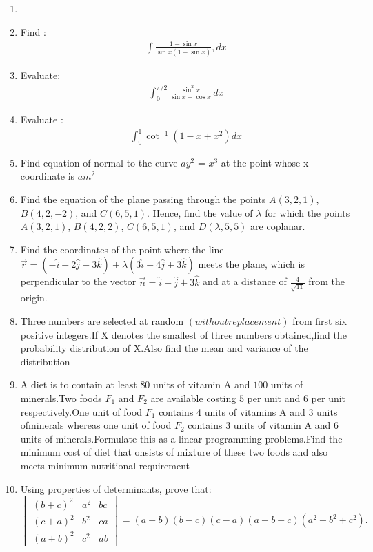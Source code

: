 \documentclass[12pt,-letter paper]{article}
\providecommand{\mydet}[1]{\ensuremath{\begin{vmatrix}#1\end{vmatrix}}}
\providecommand{\brak}[1]{\ensuremath{\left(#1\right)}}
\begin{document}
\begin{enumerate}
\item
	\item Find : \begin{align*}\int\frac{1-\sin{x}}{\sin{x}(1+\sin{x})},dx\end{align*}
\item
	 Evaluate: \begin{align*}\int_{0}^{\pi/2} \frac{\sin^2 x}{\sin{x} + \cos{x}} \, d    x\end{align*}
\item
	 Evaluate : \begin{align*}\int_{0}^{1}\cot^{-1}(1-x+x^2)dx\end{align*}
\item
	Find equation of normal to the curve $a$$y^{2}$ = $x^{3}$ at the point whose x coordinate is $am^{2}$
\item
	Find the equation of the plane passing through the points $A\brak{3, 2,1} $, $ B \brak{4, 2, -2} $, and $ C \brak{6, 5, 1} $. Hence, find the value of $\lambda $ for which the points $A\brak{3, 2, 1}$, $B\brak{4,2, 2}$, $ C\brak{6, 5, 1}$, and $D\brak{\lambda, 5, 5}$ are coplanar.
\item
	Find the coordinates of the point where the line $ \overset{\rightarrow}{r} = (-\hat{i} - 2\hat{j} - 3\hat{k}) + \lambda\brak{3\hat{i} + 4\hat{j} + 3\hat{k}} $ meets the plane, which is perpendicular to the vector $ \overset{\rightarrow}{n} = \hat{i} + \hat{j} + 3\hat{k} $ and at a distance of $ \frac{4}{\sqrt{11}} $ from the origin.
\item
   Three numbers are selected at random $\brak{without replacement}$ from first six positive integers.If X denotes the smallest of three numbers obtained,find the probability distribution of X.Also find the mean and variance of the distribution
\item
	A diet is to contain at least $80$ units of vitamin A and $100$ units of minerals.Two foods $F_{1}$ and $F_{2}$ are available costing \rupee $5$ per unit and \rupee $6$ per unit respectively.One unit of food $F_{1}$ contains 4 units of vitamins A and 3 units ofminerals whereas one unit of food $F_{2}$ contains 3 units of vitamin A and 6 units of minerals.Formulate this as a linear programming problems.Find the minimum cost of diet that onsists of mixture of these two foods and also meets minimum nutritional requirement
\item
	Using properties of determinants, prove that: $\mydet{\brak{b+c}^2 & a^2 & bc \\ \brak{c+a}^2 & b^2 & ca \\ \brak{a+b}^2 & c^2 & ab} = \brak{a-b}\brak{b-c}\brak{c-a}\brak{a+b+c}\brak{a^2+b^2+c^2}.$


\end{enumerate}
\end{document}
